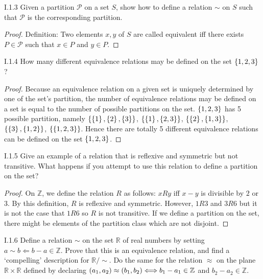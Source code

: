\begin{exercise}{I.1.3}
	Given a partition $\mathscr{P}$ on a set $S$, show how to define a relation $\sim$ on $S$ such that $\mathscr{P}$ is the corresponding partition.
\end{exercise}

\begin{proof}
	Definition: Two elements $x, y$ of $S$ are called equivalent iff there exists $P\in \mathscr{P}$ such that $x\in P$ and $y\in P$.
\end{proof}

\begin{exercise}{I.1.4}
	How many different equivalence relations may be defined on the set $\left\{{1, 2, 3}\right\}$?
\end{exercise}

\begin{proof}
	Because an equivalence relation on a given set is uniquely determined by one of the set's partition, the number of equivalence relations may be defined on a set is equal to the number of possible partitions on the set. $\left\{{1, 2, 3}\right\}$ has 5 possible partition, namely $\left\{{\left\{{1}\right\}, \left\{{2}\right\}, \left\{{3}\right\}}\right\}$, $\left\{{\left\{{1}\right\}, \left\{{2, 3}\right\}}\right\}$, $\left\{{\left\{{2}\right\}, \left\{{1, 3}\right\}}\right\}$, $\left\{{\left\{{3}\right\}, \left\{{1, 2}\right\}}\right\}$, $\left\{{\left\{{1, 2, 3}\right\}}\right\}$. Hence there are totally 5 different equivalence relations can be defined on the set $\left\{{1, 2, 3}\right\}$.
\end{proof}

\begin{exercise}{I.1.5}
	Give an example of a relation that is reflexive and symmetric but not transitive. What happens if you attempt to use this relation to define a partition on the set?
\end{exercise}

\begin{proof}
	On $\mathbb{Z}$, we define the relation $R$ as follows: $xRy$ iff $x - y$ is divisible by $2$ or $3$. By this definition, $R$ is reflexive and symmetric. However, $1R3$ and $3R6$ but it is not the case that $1R6$ so $R$ is not transitive. If we define a partition on the set, there might be elements of the partition class which are not disjoint.
\end{proof}

\begin{exercise}{I.1.6}\label{exercise:I.1.6}
	Define a relation $\sim$ on the set $\mathbb{R}$ of real numbers by setting $a\sim b \Longleftarrow b - a\in\mathbb{Z}$. Prove that this is an equivalence relation, and find a `compelling' description for $\mathbb{R}/\sim$. Do the same for the relation $\approx$ on the plane $\mathbb{R}\times\mathbb{R}$ defined by declaring $\left({a_{1}, a_{2}}\right) \approx \left({b_{1}, b_{2}}\right) \Longleftrightarrow b_{1} - a_{1} \in \mathbb{Z}$ and $b_{2} - a_{2}\in\mathbb{Z}$.
\end{exercise}

